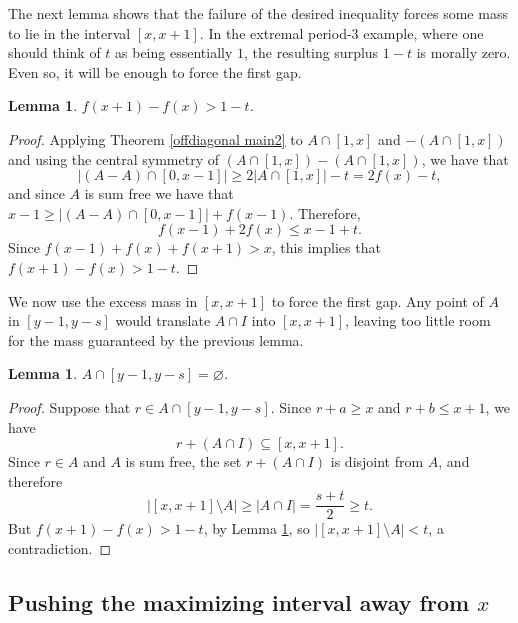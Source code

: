 \documentclass[11pt,reqno]{amsart}
\newtheorem{lem}[thm]{Lemma}
\theoremstyle{definition}
\def\F#1{f(#1)}
\begin{document}
The next lemma shows that the failure of the desired inequality forces some mass to lie in the interval $[x,x+1]$. In the extremal period-3 example, where one should think of $t$ as being essentially $1$, the resulting surplus $1-t$ is morally zero. Even so, it will be enough to force the first gap.

\begin{lem} \label{fx+1-fx}
$\F{x+1}-\F{x}>1-t$.
\end{lem}

\begin{proof}
Applying Theorem \ref{offdiagonal main2} to $A\cap[1,x]$ and $-(A\cap[1,x])$ and using the central symmetry of $(A\cap[1,x])-(A\cap[1,x])$, we have that 
\begin{equation*}
    |(A-A)\cap [0,x-1]|\geq 2|A\cap[1,x]|-t=2\F{x}-t,
\end{equation*}
and since $A$ is sum free we have that $x-1\geq |(A-A)\cap [0,x-1]|+\F{x-1}$. Therefore,
\begin{equation*}
    \F{x-1}+2\F{x}\leq x-1+t.
\end{equation*}
Since $\F{x-1}+\F{x}+\F{x+1}>x$, this implies that $\F{x + 1} - \F{x} > 1 - t$.
\end{proof}
We now use the excess mass in $[x,x+1]$ to force the first gap. Any point of $A$ in $[y-1,y-s]$ would translate $A\cap I$ into $[x,x+1]$, leaving too little room for the mass guaranteed by the previous lemma.
\begin{lem}\label{gapy}
    $A\cap[y-1,y-s]=\varnothing$.
\end{lem}
\begin{proof}
Suppose that $r\in A\cap[y-1,y-s]$. Since $r+a\geq x$ and $r+b\leq x+1$, we have
$$
r+(A\cap I)\subseteq [x,x+1].
$$
Since $r\in A$ and $A$ is sum free, the set $r+(A\cap I)$ is disjoint from $A$, and therefore
$$
|[x,x+1]\setminus A|\geq |A\cap I|=\frac{s+t}{2}\geq t.
$$
But $\F{x+1}-\F{x}>1-t$, by Lemma \ref{fx+1-fx}, so $|[x,x+1]\setminus A|<t$, a contradiction.
\end{proof}

\subsection{Pushing the maximizing interval away from $x$}
\end{document}
